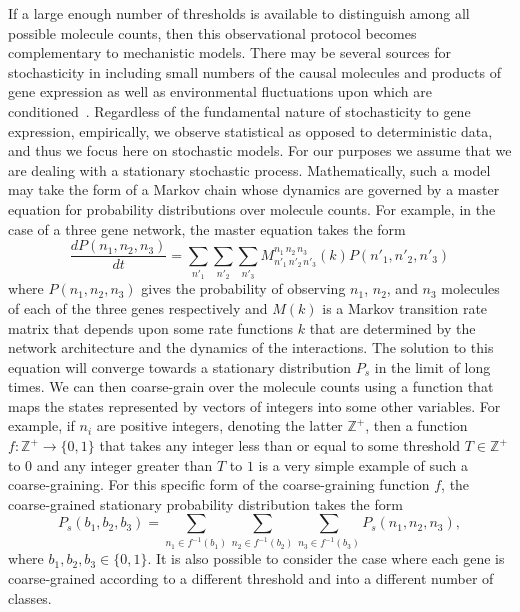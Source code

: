 If a large enough number of thresholds is available to distinguish among all possible molecule counts, then this observational protocol becomes complementary to mechanistic models.  There may be several sources for stochasticity in \gnpm{} including small numbers of the causal molecules and products of gene expression as well as environmental fluctuations upon which \gnpm{} are conditioned~\cite{Swain2002,Paulsson2004,Thattai2004,Acar2008a,Lestas2010,Munsky2012,Chalancon2012,Neuert2013,Sanchez2013}. Regardless of the fundamental nature of stochasticity to gene expression, empirically, we observe statistical as opposed to deterministic data, and thus we focus here on stochastic models. For our purposes we assume that we are dealing with a stationary stochastic process. Mathematically, such a model may take the form of a Markov chain whose dynamics are governed by a master equation for probability distributions over molecule counts. For example, in the case of a three gene network, the master equation takes the form
$$
\frac{dP(n_1,n_2,n_3)}{dt} = \sum_{n'_1}\sum_{n'_2}\sum_{n'_3} M^{n_1\,n_2\,n_3}_{n'_1\,n'_2\,n'_3}(k) P(n'_1,n'_2,n'_3)
$$
where $P(n_1,n_2,n_3)$ gives the probability of observing $n_1$, $n_2$, and $n_3$ molecules of each of the three genes respectively and $M(k)$ is a Markov transition rate matrix that depends upon some rate functions $k$ that are determined by the network architecture and the dynamics of the interactions.  The solution to this equation will converge towards  a stationary distribution $P_s$ in the limit of long times. We can then coarse-grain over the molecule counts using a function that maps the states represented by vectors of integers into some other variables. For example, if $n_i$ are positive integers, denoting the latter $\mathbb{Z}^+$, then a function $f \colon \mathbb{Z}^+ \rightarrow \{0,1\}$ that takes any integer less than or equal to some threshold $T \in \mathbb{Z}^+$ to $0$ and any integer greater than $T$ to $1$ is a very simple example of such a coarse-graining. For this specific form of the coarse-graining function $f$, the coarse-grained stationary probability distribution takes the form
$$
P_s(b_1,b_2,b_3) = \sum_{n_1 \in f^{-1}(b_1)}\sum_{n_2 \in f^{-1}(b_2)}\sum_{n_3 \in f^{-1}(b_3)} P_s(n_1,n_2,n_3),
$$
where $b_1,b_2,b_3 \in \{ 0,1 \}$. It is also possible to consider the case where each gene is coarse-grained according to a different threshold and into a different number of classes.


